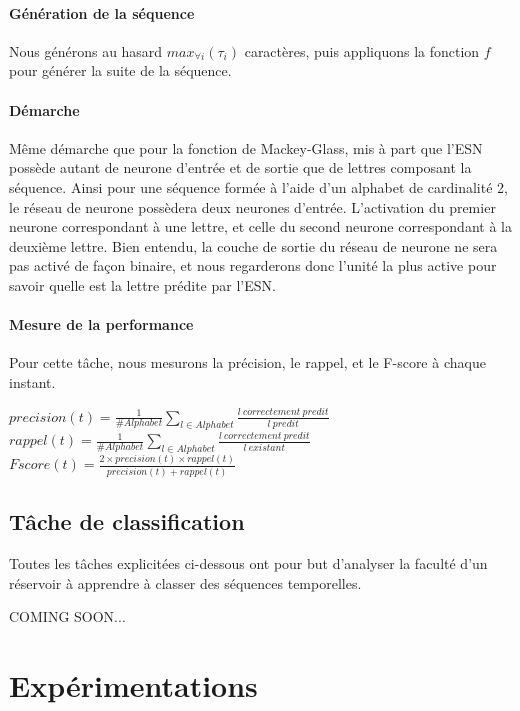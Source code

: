 \documentclass[12pt]{article}
\begin{document}
\paragraph{Génération de la séquence}
Nous générons au hasard $max_{\forall i}(\tau_{i})$ caractères, puis appliquons la fonction $f$ pour générer la suite de la séquence.
\paragraph{Démarche}
Même démarche que pour la fonction de Mackey-Glass, mis à part que l'ESN possède autant de neurone d'entrée et de sortie que de lettres composant la séquence. Ainsi pour une séquence formée à l'aide d'un alphabet de cardinalité 2, le réseau de neurone possèdera deux neurones d'entrée. L'activation du premier neurone correspondant à une lettre, et celle du second neurone correspondant à la deuxième lettre. Bien entendu, la couche de sortie du réseau de neurone ne sera pas activé de façon binaire, et nous regarderons donc l'unité la plus active pour savoir quelle est la lettre prédite par l'ESN.
\paragraph{Mesure de la performance}
Pour cette tâche, nous mesurons la précision, le rappel, et le F-score à chaque instant.
\begin{center}
$precision(t) = \frac{1}{\#Alphabet} \sum_{l \in Alphabet} \frac{l\ correctement\ predit}{l\ predit}$\\
$rappel(t) = \frac{1}{\#Alphabet} \sum_{l \in Alphabet} \frac{l\ correctement\ predit}{l\ existant}$\\
$Fscore(t) = \frac{2 \times precision(t) \times rappel(t)}{precision(t) + rappel(t)}$\\
\end{center}

\subsection{Tâche de classification}

Toutes les tâches explicitées ci-dessous ont pour but d'analyser la faculté d'un réservoir à apprendre à classer des séquences temporelles.

\begin{center}
COMING SOON... 
\end{center}

\section{Expérimentations}
\end{document}
